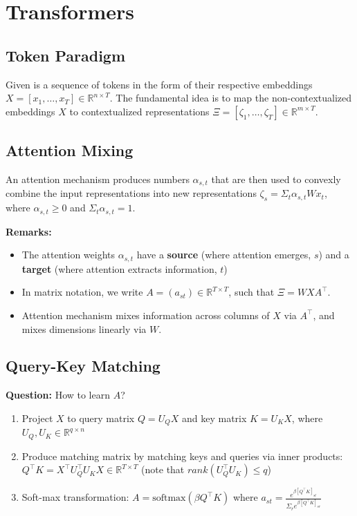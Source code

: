 \section{Transformers}

\subsection{Token Paradigm}
Given is a sequence of tokens in the form of their respective embeddings $X = \left[x_1, \dots, x_T\right]\in \mathbb{R}^{n\times T}$. The fundamental idea is to map the non-contextualized embeddings $X$ to contextualized representations $\Xi = \left[\zeta_1, \dots, \zeta_T\right]\in \mathbb{R}^{m \times T}$. 

\subsection{Attention Mixing}
An attention mechanism produces numbers $\alpha_{s, t}$ that are then used to convexly combine the input representations into new representations $\zeta_s = \Sigma_t \alpha_{s, t}Wx_t$, where $\alpha_{s, t} \geq 0$ and $\Sigma_t \alpha_{s, t} = 1$. 

\textbf{Remarks:}\begin{itemize}
    \item The attention weights $\alpha_{s, t}$ have a \textbf{source} (where attention emerges, $s$) and a \textbf{target} (where attention extracts information, $t$)
    \item In matrix notation, we write $A = (a_{st}) \in \mathbb{R}^{T \times T}$, such that $\Xi = WXA^{\intercal}$. 
    \item Attention mechanism mixes information across columns of $X$ via $A^{\intercal}$, and mixes dimensions linearly via $W$. 
\end{itemize}

\subsection{Query-Key Matching}
\textbf{Question:} How to learn $A$?
\begin{enumerate}
    \item Project $X$ to query matrix $Q = U_QX$ and key matrix $K=U_KX$, where $U_Q, U_K \in \mathbb{R}^{q \times n}$
    \item Produce matching matrix by matching keys and queries via inner products: $Q^{\intercal}K = X^{\intercal}U_Q^{\intercal}U_KX \in \mathbb{R}^{T \times T}$ (note that $rank(U_Q^{\intercal}U_K) \leq q$)
    \item Soft-max transformation: $A = \text{softmax}(\beta Q^{\intercal}K)$ where $a_{st} = \frac{e^{\beta[Q^{\intercal}K]_{st}}}{\Sigma_re^{\beta[Q^{\intercal}K]_{sr}}}$
\end{enumerate}

